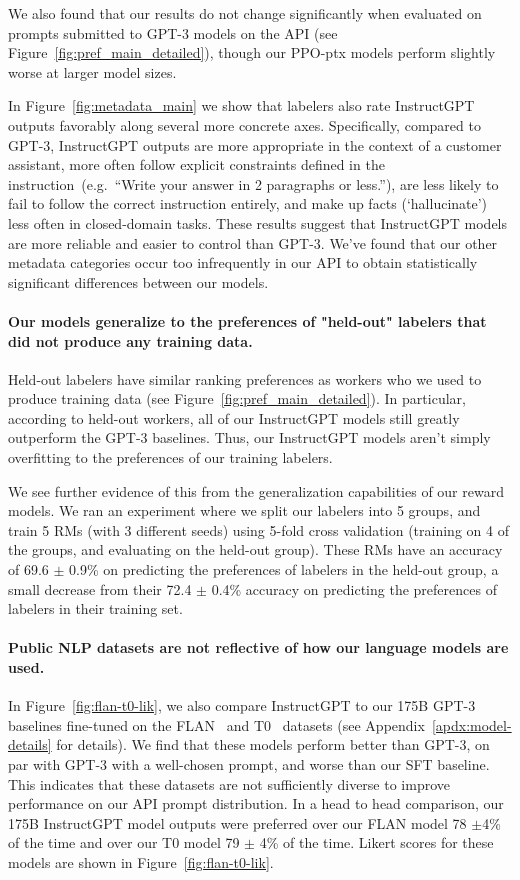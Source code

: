 We also found that our results do not change significantly when evaluated on prompts submitted to GPT-3 models on the API (see Figure~\ref{fig:pref_main_detailed}), though our PPO-ptx models perform slightly worse at larger model sizes.

In Figure~\ref{fig:metadata_main} we show that labelers also rate InstructGPT outputs favorably along several more concrete axes. Specifically, compared to GPT-3, InstructGPT outputs are more appropriate in the context of a customer assistant, more often follow explicit constraints defined in the instruction~(e.g.\ ``Write your answer in 2 paragraphs or less.''), are less likely to fail to follow the correct instruction entirely, and make up facts (`hallucinate') less often in closed-domain tasks. These results suggest that InstructGPT models are more reliable and easier to control than GPT-3. We've found that our other metadata categories occur too infrequently in our API to obtain statistically significant differences between our models. 

\paragraph{Our models generalize to the preferences of "held-out" labelers that did not produce any training data.} Held-out labelers have similar ranking preferences as workers who we used to produce training data (see Figure~\ref{fig:pref_main_detailed}). In particular, according to held-out workers, all of our InstructGPT models still greatly outperform the GPT-3 baselines. Thus, our InstructGPT models aren't simply overfitting to the preferences of our training labelers.

We see further evidence of this from the generalization capabilities of our reward models. We ran an experiment where we split our labelers into 5 groups, and train 5 RMs (with 3 different seeds) using 5-fold cross validation (training on 4 of the groups, and evaluating on the held-out group). These RMs have an accuracy of 69.6 $\pm$ 0.9\% on predicting the preferences of labelers in the held-out group, a small decrease from their 72.4 $\pm$ 0.4\% accuracy on predicting the preferences of labelers in their training set.

\paragraph{Public NLP datasets are not reflective of how our language models are used.} In Figure~\ref{fig:flan-t0-lik}, we also compare InstructGPT to our 175B GPT-3 baselines fine-tuned on the FLAN~\citep{wei2021finetuned} and T0~\citep{sanh2021multitask} datasets (see Appendix~\ref{apdx:model-details} for details). We find that these models perform better than GPT-3, on par with GPT-3 with a well-chosen prompt, and worse than our SFT baseline. This indicates that these datasets are not sufficiently diverse to improve performance on our API prompt distribution. In a head to head comparison, our 175B InstructGPT model outputs were preferred over our FLAN model 78 $\pm$4\% of the time and over our T0 model 79 $\pm$ 4\% of the time. Likert scores for these models are shown in Figure~\ref{fig:flan-t0-lik}.

